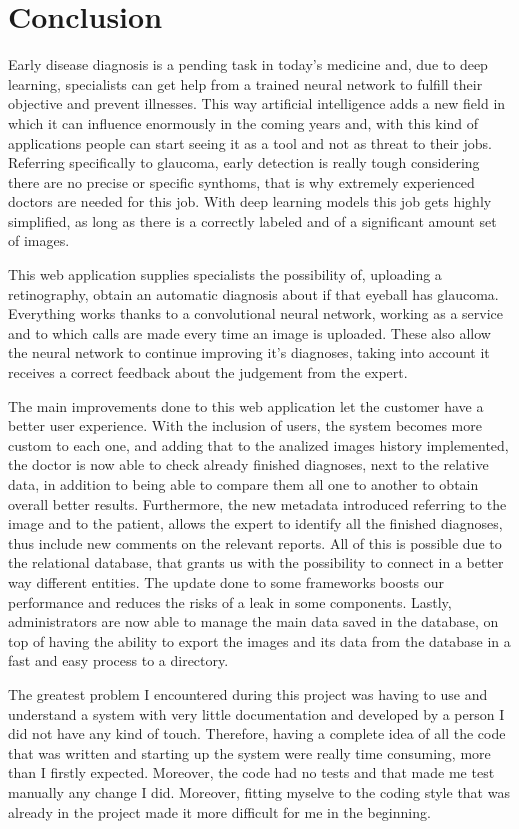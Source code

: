 \section{Conclusion}
Early disease diagnosis is a pending task in today's medicine and, due to deep learning, specialists can get help from a trained neural network to fulfill their objective and prevent illnesses. This way artificial intelligence adds a new field in which it can influence enormously in the coming years and, with this kind of applications people can start seeing it as a tool and not as threat to their jobs. Referring specifically to glaucoma, early detection is really tough considering there are no precise or specific synthoms, that is why extremely experienced doctors are needed for this job. With deep learning models this job gets highly simplified, as long as there is a correctly labeled and of a significant amount set of images.
\par
This web application supplies specialists the possibility of, uploading a retinography, obtain an automatic diagnosis about if that eyeball has glaucoma. Everything works thanks to a convolutional neural network, working as a service and to which calls are made every time an image is uploaded. These also allow the neural network to continue improving it's diagnoses, taking into account it receives a correct feedback about the judgement from the expert.
\par
The main improvements done to this web application let the customer have a better user experience. With the inclusion of users, the system becomes more custom to each one, and adding that to the analized images history implemented, the doctor is now able to check already finished diagnoses, next to  the relative data, in addition to being able to compare them all one to another to obtain overall better results. Furthermore, the new metadata introduced referring to the image and to the patient, allows the expert to identify all the finished diagnoses, thus include new comments on the relevant reports. All of this is possible due to the relational database, that grants us with the possibility to connect in a better way different entities. The update done to some frameworks boosts our performance and reduces the risks of a leak in some components. Lastly, administrators are now able to manage the main data saved in the database, on top of having the ability to export the images and its data from the database in a fast and easy process to a directory.
\par
The greatest problem I encountered during this project was having to use and understand a system with very little documentation and developed by a person I did not have any kind of touch. Therefore, having a complete idea of all the code that was written and starting up the system were really time consuming, more than I firstly expected. Moreover, the code had no tests and that made me test manually any change I did. Moreover, fitting myselve to the coding style that was already in the project made it more difficult for me in the beginning.
